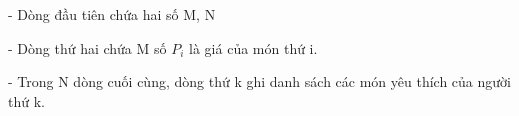 - Dòng đầu tiên chứa hai số M, N   


   - Dòng thứ hai chứa M số $P_{i}$   là giá của món thứ i.   


   - Trong N dòng cuối cùng, dòng thứ k ghi danh sách các món yêu thích của người thứ k.